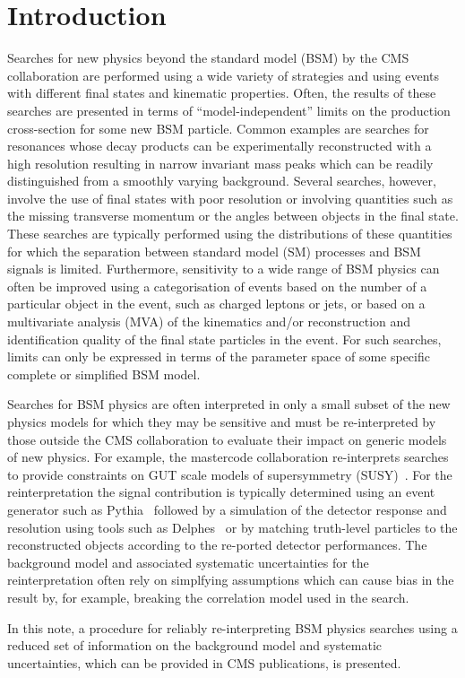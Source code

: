 \section{Introduction}
\label{sec:intro}

Searches for new physics beyond the standard model (BSM) by the CMS collaboration are performed using a wide variety of 
strategies and using events with different final states and kinematic properties.  Often, 
the results of these searches are presented in terms of ``model-independent'' limits on the production 
cross-section for some new BSM particle. Common examples are searches for resonances whose decay products 
can be experimentally reconstructed with a high resolution resulting in narrow invariant mass peaks which can be readily distinguished from 
a smoothly varying background. Several searches, however, involve the use of final states with poor resolution or involving 
quantities such as the missing transverse momentum or the angles between objects in the final state. These searches are typically performed using the 
distributions of these quantities for which the separation between standard model (SM) processes and BSM signals is limited. Furthermore, 
sensitivity to a wide range of BSM physics can often be improved using a categorisation of events based on the number of a particular 
object in the event, such as charged leptons or jets, or based on a multivariate analysis (MVA) of the kinematics and/or reconstruction and 
identification quality of the final state particles in the event. For such searches, limits can only be expressed in terms of the 
parameter space of some specific complete or simplified BSM model.

Searches for BSM physics are often interpreted in only a small subset of the new physics
models for which they may be sensitive and must be re-interpreted by those
outside the CMS collaboration to evaluate their impact on generic models of new physics.
For example, the mastercode collaboration re-interprets searches to provide constraints
on GUT scale models of supersymmetry (SUSY)~\cite{mastercode}. For the reinterpretation the signal contribution 
is typically determined using an event generator such as {\sc Pythia}~\cite{pythia} followed by a simulation of the detector 
response and resolution using tools such as {\sc Delphes}~\cite{delphes} or by matching truth-level particles to
the reconstructed objects according to the re-ported detector performances. 
The background model and associated systematic uncertainties for the reinterpretation often rely
on simplfying assumptions which can cause bias in the result by, for example, breaking the 
correlation model used in the search. 

In this note, a procedure for reliably re-interpreting BSM physics searches using a reduced set of information
 on the background model and systematic uncertainties, which can be provided in CMS publications, is presented.



